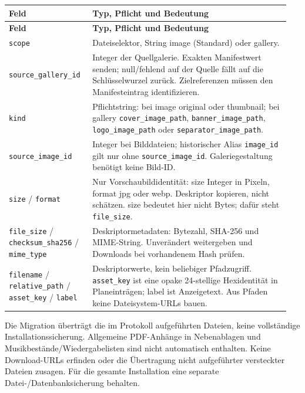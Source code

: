 \documentclass[11pt,a4paper]{article}
\newcommand{\codeword}[1]{\nolinkurl{#1}}
\begin{document}
\begin{longtable}{@{}>{\RaggedRight\arraybackslash}p{0.28\linewidth}>{\RaggedRight\arraybackslash}p{0.67\linewidth}@{}}
\toprule
\textbf{Feld} & \textbf{Typ, Pflicht und Bedeutung} \\
\midrule
\endfirsthead
\toprule
\textbf{Feld} & \textbf{Typ, Pflicht und Bedeutung} \\
\midrule
\endhead
\bottomrule
\endfoot
\codeword{scope} & Dateiselektor, String image (Standard) oder gallery. \\
\codeword{source_gallery_id} & Integer der Quellgalerie. Exakten Manifestwert senden;
null/fehlend auf der Quelle fällt auf die Schlüsselwurzel zurück. Zielreferenzen müssen den
Manifesteintrag identifizieren. \\
\codeword{kind} & Pflichtstring: bei image original oder thumbnail; bei gallery
\codeword{cover_image_path}, \codeword{banner_image_path}, \codeword{logo_image_path} oder
\codeword{separator_image_path}. \\
\codeword{source_image_id} & Integer bei Bilddateien; historischer Alias \codeword{image_id}
gilt nur ohne \codeword{source_image_id}. Galeriegestaltung benötigt keine Bild-ID. \\
\codeword{size} / \codeword{format} & Nur Vorschaubildidentität: size Integer in Pixeln,
format jpg oder webp. Deskriptor kopieren, nicht schätzen. size bedeutet hier nicht Bytes;
dafür steht \codeword{file_size}. \\
\codeword{file_size} / \codeword{checksum_sha256} / \codeword{mime_type} &
Deskriptormetadaten: Bytezahl, SHA-256 und MIME-String. Unverändert weitergeben und
Downloads bei vorhandenem Hash prüfen. \\
\codeword{filename} / \codeword{relative_path} / \codeword{asset_key} / \codeword{label} &
Deskriptorwerte, kein beliebiger Pfadzugriff. \codeword{asset_key} ist eine opake
24-stellige Hexidentität in Planeinträgen; label ist Anzeigetext. Aus Pfaden keine
Dateisystem-URLs bauen. \\
\end{longtable}

Die Migration überträgt die im Protokoll aufgeführten Dateien, keine vollständige
Installationssicherung. Allgemeine PDF-Anhänge in Nebenablagen und
Musikbestände/Wiedergabelisten sind nicht automatisch enthalten. Keine Download-URLs
erfinden oder die Übertragung nicht aufgeführter versteckter Dateien zusagen. Für die
gesamte Installation eine separate Datei-/Datenbanksicherung behalten.
\end{document}
